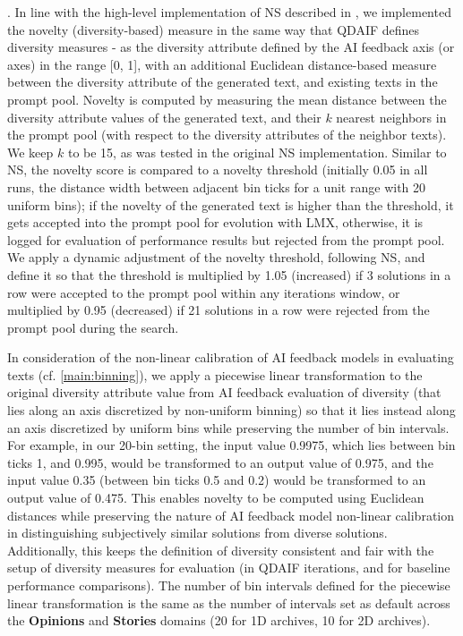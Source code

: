 \basesix. In line with the high-level implementation of NS described in \citet{lehman2008exploiting}, we implemented the novelty (diversity-based) measure in the same way that QDAIF defines diversity measures - as the diversity attribute defined by the AI feedback axis (or axes) in the range [0, 1], with an additional Euclidean distance-based measure between the diversity attribute of the generated text, and existing texts in the prompt pool. Novelty is computed by measuring the mean distance between the diversity attribute values of the generated text, and their $k$ nearest neighbors in the prompt pool (with respect to the diversity attributes of the neighbor texts). We keep $k$ to be 15, as was tested in the original NS implementation. Similar to NS, the novelty score is compared to a novelty threshold (initially 0.05 in all \basesix{} runs, the distance width between adjacent bin ticks for a unit range with 20 uniform bins); if the novelty of the generated text is higher than the threshold, it gets accepted into the prompt pool for evolution with LMX, otherwise, it is logged for evaluation of performance results but rejected from the prompt pool. We apply a dynamic adjustment of the novelty threshold, following NS, and define it so that the threshold is multiplied by 1.05 (increased) if 3 solutions in a row were accepted to the prompt pool within any iterations window, or multiplied by 0.95 (decreased) if 21 solutions in a row were rejected from the prompt pool during the search.

In consideration of the non-linear calibration of AI feedback models in evaluating texts (cf. \cref{main:binning}), we apply a piecewise linear transformation to the original diversity attribute value from AI feedback evaluation of diversity (that lies along an axis discretized by non-uniform binning) so that it lies instead along an axis discretized by uniform bins while preserving the number of bin intervals. For example, in our 20-bin setting, the input value 0.9975, which lies between bin ticks 1, and 0.995, would be transformed to an output value of 0.975, and the input value 0.35 (between bin ticks 0.5 and 0.2) would be transformed to an output value of 0.475. This enables novelty to be computed using Euclidean distances while preserving the nature of AI feedback model non-linear calibration in distinguishing subjectively similar solutions from diverse solutions. Additionally, this keeps the definition of diversity consistent and fair with the setup of diversity measures for evaluation (in QDAIF iterations, and for baseline performance comparisons). The number of bin intervals defined for the piecewise linear transformation is the same as the number of intervals set as default across the \textbf{Opinions} and \textbf{Stories} domains (20 for 1D archives, 10 for 2D archives).

